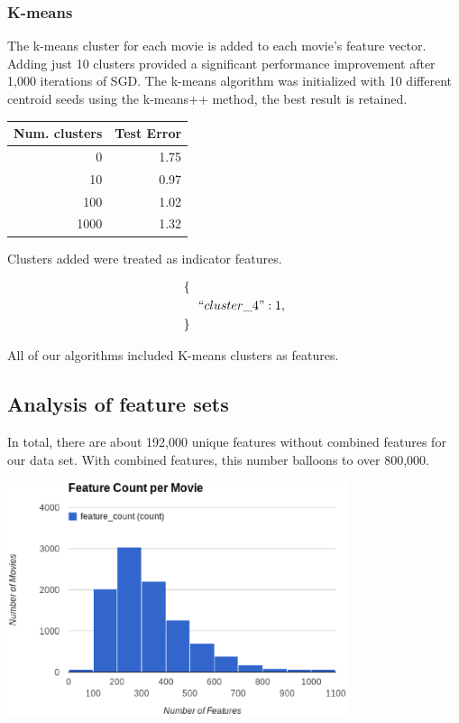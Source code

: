 \documentclass[journal]{IEEEtran}
\begin{document}
\subsubsection{K-means}
The k-means cluster for each movie is added to each movie's feature vector.
Adding just 10 clusters provided a significant performance improvement after
1,000 iterations of SGD.  The k-means algorithm was initialized with 10 different
centroid seeds using the k-means++ method, the best result is retained.

\begin{center}
\begin{tabular}{|r| r|} %
\hline
Num. clusters & Test Error  \\ [0.5ex] %
\hline
0 & 1.75 \\
10 & 0.97 \\
100 & 1.02 \\
1000 & 1.32 \\
\hline %
\end{tabular}
\end{center}

Clusters added were treated as indicator features.

\begin{align*}
        \{\ \ &\\
        &``cluster\_4": 1,\\
        \}\ \ &
\end{align*}

All of our algorithms included K-means clusters as features.

\subsection{Analysis of feature sets}
In total, there are about 192,000 unique features without combined features for
our data set.  With combined features, this number balloons to over 800,000.

\includegraphics[width=10cm]{charts/features.eps}
\end{document}

